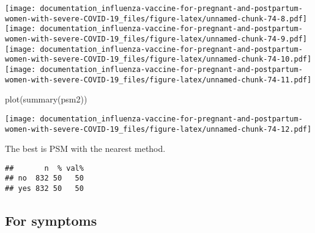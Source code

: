\documentclass[
]{article}
\newenvironment{Shaded}{\begin{snugshade}}{\end{snugshade}}
\newcommand{\AttributeTok}[1]{\textcolor[rgb]{0.77,0.63,0.00}{#1}}
\newcommand{\CommentTok}[1]{\textcolor[rgb]{0.56,0.35,0.01}{\textit{#1}}}
\newcommand{\DecValTok}[1]{\textcolor[rgb]{0.00,0.00,0.81}{#1}}
\newcommand{\FunctionTok}[1]{\textcolor[rgb]{0.00,0.00,0.00}{#1}}
\newcommand{\NormalTok}[1]{#1}
\newcommand{\OtherTok}[1]{\textcolor[rgb]{0.56,0.35,0.01}{#1}}
\newcommand{\SpecialCharTok}[1]{\textcolor[rgb]{0.00,0.00,0.00}{#1}}
\newcommand{\StringTok}[1]{\textcolor[rgb]{0.31,0.60,0.02}{#1}}
\begin{document}
\texttt{[image: documentation\_influenza-vaccine-for-pregnant-and-postpartum-women-with-severe-COVID-19\_files/figure-latex/unnamed-chunk-74-8.pdf]}
\texttt{[image: documentation\_influenza-vaccine-for-pregnant-and-postpartum-women-with-severe-COVID-19\_files/figure-latex/unnamed-chunk-74-9.pdf]}
\texttt{[image: documentation\_influenza-vaccine-for-pregnant-and-postpartum-women-with-severe-COVID-19\_files/figure-latex/unnamed-chunk-74-10.pdf]}
\texttt{[image: documentation\_influenza-vaccine-for-pregnant-and-postpartum-women-with-severe-COVID-19\_files/figure-latex/unnamed-chunk-74-11.pdf]}

\begin{Shaded}
\begin{Highlighting}[]
\FunctionTok{plot}\NormalTok{(}\FunctionTok{summary}\NormalTok{(psm2))}
\end{Highlighting}
\end{Shaded}

\texttt{[image: documentation\_influenza-vaccine-for-pregnant-and-postpartum-women-with-severe-COVID-19\_files/figure-latex/unnamed-chunk-74-12.pdf]}

The best is PSM with the nearest method.

\begin{Shaded}
\end{Shaded}

\begin{verbatim}
##       n  % val%
## no  832 50   50
## yes 832 50   50
\end{verbatim}

\hypertarget{for-symptoms}{%
\subsection{For symptoms}\label{for-symptoms}}
\end{document}
